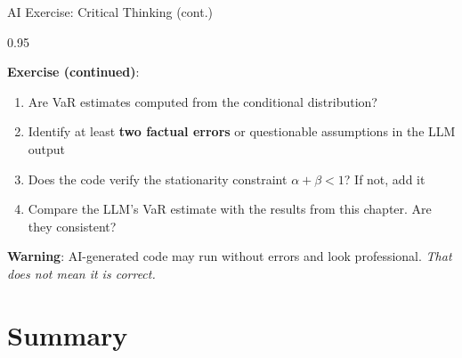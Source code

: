 \documentclass[9pt, aspectratio=169, t]{beamer}
\begin{document}
\begin{frame}{AI Exercise: Critical Thinking (cont.)}
    \begin{cminipage}{0.95\textwidth}
        {\footnotesize
        \textbf{Exercise (continued)}:
        \begin{enumerate}\setlength{\itemsep}{0pt}
            \setcounter{enumi}{5}
            \item Are VaR estimates computed from the conditional distribution?
            \item Identify at least \textbf{two factual errors} or questionable assumptions in the LLM output
            \item Does the code verify the stationarity constraint $\alpha + \beta < 1$? If not, add it
            \item Compare the LLM's VaR estimate with the results from this chapter. Are they consistent?
        \end{enumerate}
        }
        \vspace{-2mm}
        \begin{alertblock}{}
            {\footnotesize \textbf{Warning}: AI-generated code may run without errors and look professional. \textit{That does not mean it is correct.}}
        \end{alertblock}
    \end{cminipage}
\end{frame}

\section{Summary}
\end{document}
